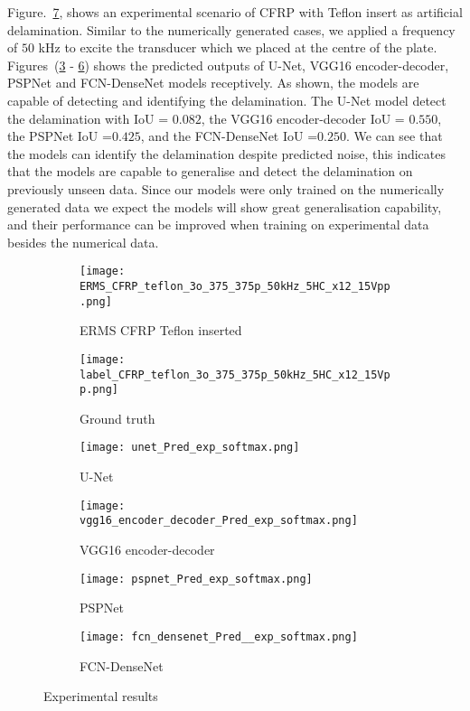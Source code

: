 Figure.~\ref{fig:Exp_ERMS_teflon}, shows an experimental scenario of CFRP with Teflon insert as artificial delamination.
Similar to the numerically generated cases, we applied a frequency of \(50\) kHz to excite the transducer which we placed at the centre of the plate.
Figures~(\ref{fig:unet_exp_7_} - \ref{fig:fcn_densenet_exp}) shows the predicted outputs of U-Net, VGG16 encoder-decoder, PSPNet and FCN-DenseNet models receptively.
As shown, the models are capable of detecting and identifying the delamination. 
The U-Net model detect the delamination with IoU = \(0.082\), the VGG16 encoder-decoder IoU  = \(0.550\), the PSPNet IoU =\(0.425\), and the FCN-DenseNet IoU =\(0.250\).
We can see that the models can identify the delamination despite predicted noise, this indicates that the models are capable to generalise and detect the delamination on previously unseen data. 
Since our models were only trained on the numerically generated data we expect the models will show great generalisation capability, and their performance can be improved when training on experimental data besides the numerical data. 
\begin{figure} [!h]
	\centering
	\begin{subfigure}[b]{0.47\textwidth}
		\centering
		\texttt{[image: ERMS\_CFRP\_teflon\_3o\_375\_375p\_50kHz\_5HC\_x12\_15Vpp.png]}
		\caption{ERMS CFRP Teflon inserted}
		\label{fig:Delamination}
	\end{subfigure}			
	\hfill
	\begin{subfigure}[b]{0.47\textwidth}
		\centering 	
		\texttt{[image: label\_CFRP\_teflon\_3o\_375\_375p\_50kHz\_5HC\_x12\_15Vpp.png]}
		\caption{Ground truth} 
		\label{fig:damage_label}
	\end{subfigure}
	\hfill
	\begin{subfigure}[b]{0.47\textwidth}
		\centering
		\texttt{[image: unet\_Pred\_exp\_softmax.png]}
		\caption{U-Net} 
		\label{fig:unet_exp_7_}
	\end{subfigure}
	\hfill
	\begin{subfigure}[b]{0.47\textwidth}
	\centering
	\texttt{[image: vgg16\_encoder\_decoder\_Pred\_exp\_softmax.png]}
	\caption{VGG16 encoder-decoder} 
	\label{fig:vgg16_exp_7_}
	\end{subfigure}
	\hfill
	\begin{subfigure}[b]{0.47\textwidth}
		\centering
		\texttt{[image: pspnet\_Pred\_exp\_softmax.png]}
		\caption{PSPNet} 
		\label{fig:pspnet_exp_7_}
	\end{subfigure}
	\hfill
	\begin{subfigure}[b]{0.47\textwidth}
		\centering
		\texttt{[image: fcn\_densenet\_Pred\_\_exp\_softmax.png]}
		\caption{FCN-DenseNet} 
		\label{fig:fcn_densenet_exp}
	\end{subfigure}
		\caption{Experimental results}
		\label{fig:Exp_ERMS_teflon}
	\end{figure}

